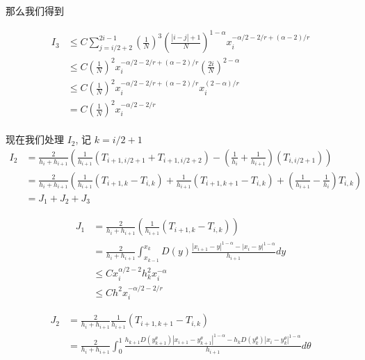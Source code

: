 \documentclass{ctexart}
\begin{document}
那么我们得到

\begin{equation}
    \begin{aligned}
        I_3 &\le C \sum_{j=i/2+2}^{2i-1} \left(\frac{1}{N}\right)^3 \left(\frac{|i-j|+1}{N}\right)^{1-\alpha} x_i^{-\alpha/2-2/r+(\alpha-2)/r}   \\
        & \le C  \left(\frac{1}{N}\right)^2 x_i^{-\alpha/2-2/r+(\alpha-2)/r} \left(\frac{2i}{N}\right)^{2-\alpha}   \\
        &\le C \left(\frac{1}{N}\right)^2 x_i^{-\alpha/2-2/r+(\alpha-2)/r} x_i^{(2-\alpha)/r}   \\
        & = C \left(\frac{1}{N}\right)^2 x_i^{-\alpha/2-2/r}
    \end{aligned}
\end{equation}
\\


现在我们处理 \(I_2\), 记 \(k = i/2+1\)
\begin{equation}
    \begin{aligned}
        I_2 &= \frac{2}{h_i + h_{i+1}} 
          \left( \frac{1}{h_{i+1}} (T_{i+1, i/2+1} +  T_{i+1, i/2+2})
          - (\frac{1}{h_{i}}+\frac{1}{h_{i+1}}) (T_{i,i/2+1}) \right)   \\
          &= \frac{2}{h_i + h_{i+1}} 
          \left( \frac{1}{h_{i+1}} (T_{i+1, k} -  T_{i, k})
          + \frac{1}{h_{i+1}} (T_{i+1, k+1} - T_{i,k}) + (\frac{1}{h_{i+1}} - \frac{1}{h_{i}}) T_{i,k} \right)   \\
          &= J_1 + J_2 + J_3
    \end{aligned}
\end{equation}


\begin{equation}
    \begin{aligned} 
        J_1 &= \frac{2}{h_i + h_{i+1}} \left( \frac{1}{h_{i+1}} (T_{i+1, k} -  T_{i, k}) \right)    \\
        & = \frac{2}{h_i + h_{i+1}} \int_{x_{k-1}}^{x_k} D(y) \frac{|x_{i+1}-y|^{1-\alpha} - |x_i-y|^{1-\alpha}}{h_{i+1}} dy    \\
        &\le C x_i^{\alpha/2-2} h_k^2 x_i^{-\alpha} \\
        & \le C h^2 x_i^{-\alpha/2-2/r}
    \end{aligned}
\end{equation}

\begin{equation}
    \begin{aligned}
        J_2 &= \frac{2}{h_i + h_{i+1}}\frac{1}{h_{i+1}} \left(T_{i+1, k+1} -T_{i,k} \right)  \\
        &= \frac{2}{h_i + h_{i+1}} \int_{0}^1 \frac{h_{k+1}D(y_{k+1}^\theta)|x_{i+1}-y_{k+1}^\theta|^{1-\alpha} - h_k D(y_{k}^\theta)|x_{i}-y_{k}^\theta|^{1-\alpha}}{h_{i+1}} d\theta
    \end{aligned}
\end{equation}
\end{document}
